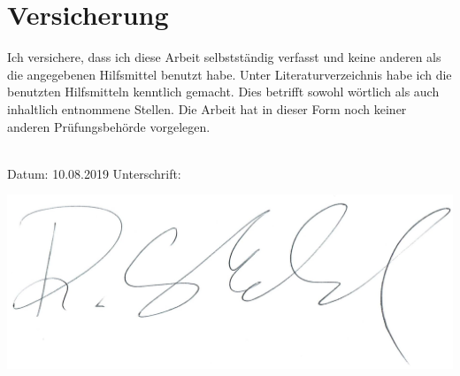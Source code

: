 \chapter*{Versicherung}

Ich versichere, dass ich diese Arbeit selbstständig verfasst und keine anderen als die angegebenen Hilfsmittel benutzt habe. Unter Literaturverzeichnis habe ich die benutzten Hilfsmitteln kenntlich gemacht. Dies betrifft sowohl wörtlich als auch inhaltlich entnommene Stellen. Die Arbeit hat in dieser Form noch keiner anderen Prüfungsbehörde vorgelegen.  
\\
\\[1.0cm]
\begin{minipage}{0.45\linewidth}
Datum:	10.08.2019 \hspace{35pt} Unterschrift: 
\end{minipage}
\hfill
\begin{minipage}{0.45\linewidth}
\includegraphics[scale=0.4]{img/Unterschrift.jpg}
\end{minipage}